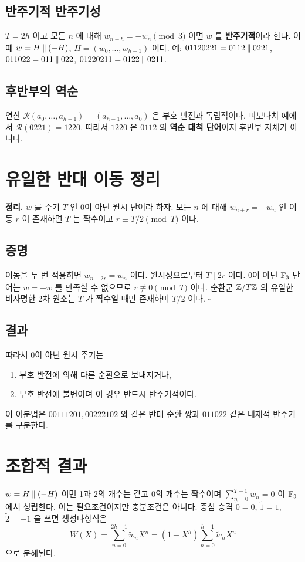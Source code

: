 \documentclass[11pt,a4paper]{article}
\begin{document}
\subsection{반주기적 반주기성}
\(T=2h\) 이고 모든 \(n\) 에 대해 \(w_{n+h}=-w_n\pmod3\) 이면 \(w\) 를 \textbf{반주기적}이라 한다. 이때 \(w=H\mathbin{\Vert}(-H)\), \(H=(w_0,\ldots,w_{h-1})\) 이다. 예: \(01120221=0112\mathbin{\Vert}0221\), \(011022=011\mathbin{\Vert}022\), \(01220211=0122\mathbin{\Vert}0211\).
\subsection{후반부의 역순}
연산 \(\mathcal R(a_0,\ldots,a_{h-1})=(a_{h-1},\ldots,a_0)\) 은 부호 반전과 독립적이다. 피보나치 예에서 \(\mathcal R(0221)=1220\). 따라서 \(1220\) 은 \(0112\) 의 \textbf{역순 대척 단어}이지 후반부 자체가 아니다.
\section{유일한 반대 이동 정리}
\begin{summarybox}\textbf{정리.} \(w\) 를 주기 \(T\) 인 0이 아닌 원시 단어라 하자. 모든 \(n\) 에 대해 \(w_{n+r}=-w_n\) 인 이동 \(r\) 이 존재하면 \(T\) 는 짝수이고 \(r\equiv T/2\pmod T\) 이다.\end{summarybox}
\subsection*{증명}
이동을 두 번 적용하면 \(w_{n+2r}=w_n\) 이다. 원시성으로부터 \(T\mid2r\) 이다. 0이 아닌 \(\mathbb F_3\) 단어는 \(w=-w\) 를 만족할 수 없으므로 \(r\not\equiv0\pmod T\) 이다. 순환군 \(\mathbb Z/T\mathbb Z\) 의 유일한 비자명한 2차 원소는 \(T\) 가 짝수일 때만 존재하며 \(T/2\) 이다. \hfill\(\square\)
\subsection*{결과}
따라서 0이 아닌 원시 주기는 \begin{enumerate}\item 부호 반전에 의해 다른 순환으로 보내지거나,\item 부호 반전에 불변이며 이 경우 반드시 반주기적이다.\end{enumerate} 이 이분법은 \(00111201,00222102\) 와 같은 반대 순환 쌍과 \(011022\) 같은 내재적 반주기를 구분한다.
\section{조합적 결과}
\(w=H\mathbin{\Vert}(-H)\) 이면 1과 2의 개수는 같고 0의 개수는 짝수이며 \(\sum_{n=0}^{T-1}w_n=0\) 이 \(\mathbb F_3\) 에서 성립한다. 이는 필요조건이지만 충분조건은 아니다. 중심 승격 \(\widetilde0=0\), \(\widetilde1=1\), \(\widetilde2=-1\) 을 쓰면 생성다항식은 \[W(X)=\sum_{n=0}^{2h-1}\widetilde w_nX^n=(1-X^h)\sum_{n=0}^{h-1}\widetilde w_nX^n\] 으로 분해된다.
\end{document}
